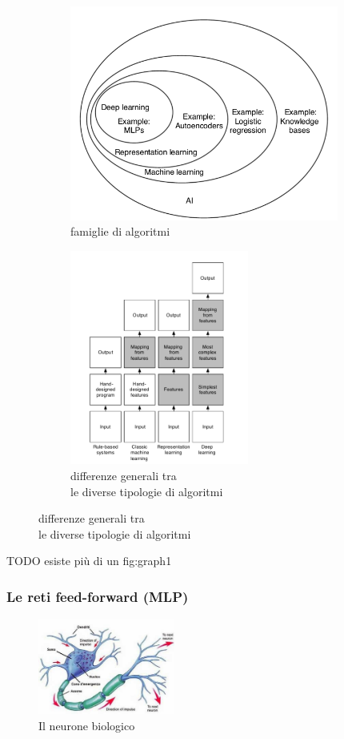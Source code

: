 \documentclass[10pt,a4paper]{article}
\begin{document}
\begin{figure}[h!]
  \centering
  \begin{subfigure}[t]{0.45\linewidth}
  	\centering
    \includegraphics[height=200pt]{AI_venn_diagram.png}
    \caption*{famiglie di algoritmi}
  \end{subfigure}
  \begin{subfigure}[t]{0.45\linewidth}
  	\centering
    \includegraphics[height=200pt]{diff_between_aprochs.png}
    \caption*{differenze generali tra \\ le diverse tipologie di algoritmi}
  \end{subfigure}
  \label{fig:graph1}
\end{figure}

TODO esiste pi\`u di un fig:graph1

\subsubsection{Le reti feed-forward (MLP)}

\begin{figure}
	\centering
	\vspace{-25pt}
    \includegraphics[width=0.4\textwidth]{neurone.jpg}
  	\caption{Il neurone biologico}
  	\label{fig:graph2}
  	\vspace{-20pt}
\end{figure}
\end{document}
